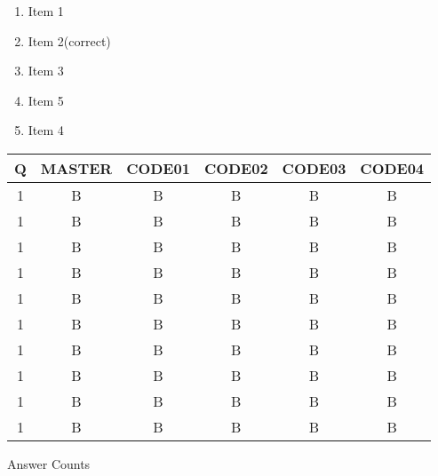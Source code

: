 \documentclass[amsfonts,bezier,leqno,fleqn,12pt,a4paper]{article}
\begin{document}
{{{{\begin{large}
\begin{enumerate}
\begin{enumerate}
\item  Item 1
\item  Item 2\hfill {\small (correct)}
\item  Item 3
\item  Item 5
\item  Item 4

\end{enumerate}
\newpage


\end{enumerate}
\end{large}






\newpage

\renewcommand{\thepage}{\noindent MATH101, Term 212, Final Exam \hfill {\bf \fbox{Answer KEY}}}
\begin{normalsize}
\setcounter{page}{1}
\vspace {1cm}

\begin{center}

  \begin{tabular}{|c||c|c|c|c|c| 
}
  \hline
  Q&MASTER&CODE01&CODE02&CODE03&CODE04 \\ \hline 
  1&B&B&B&B&B\\ \hline1&B&B&B&B&B\\ \hline1&B&B&B&B&B\\ \hline1&B&B&B&B&B\\ \hline1&B&B&B&B&B\\ \hline1&B&B&B&B&B\\ \hline1&B&B&B&B&B\\ \hline1&B&B&B&B&B\\ \hline1&B&B&B&B&B\\ \hline1&B&B&B&B&B
  \\ \hline 
  \end{tabular}
    
\end{center}
\end{normalsize}



\newpage


\renewcommand{\thepage}{\noindent MATH101, Term 212, Final Exam \hfill {\bf \fbox{Answer Counts}}}
\begin{normalsize}
\begin{center}
\vspace {1cm}

\begin{Large}
Answer Counts \\
\end{Large}
\vspace {1cm}


\end{center}
\end{normalsize}}}}}
\end{document}
